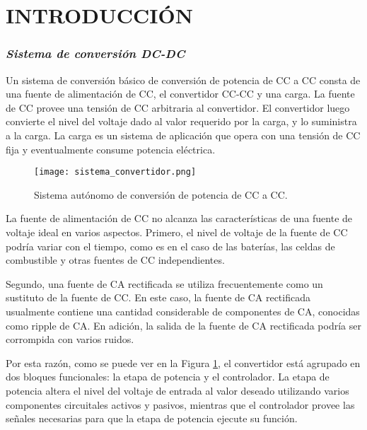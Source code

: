 \section*{\large{INTRODUCCIÓN}}
\vspace{-0.25cm}
\justifying

\subsubsection*{\it{Sistema de conversión DC-DC}}
\vspace{-0.25cm}
Un sistema de conversión básico de conversión de potencia de CC a CC consta de una fuente de alimentación de CC, el convertidor CC-CC y una carga.
La fuente de CC provee una tensión de CC arbitraria al convertidor. El convertidor luego convierte el nivel del voltaje dado al valor requerido
por la carga, y lo suministra a la carga. La carga es un sistema de aplicación que opera con una tensión de CC fija y eventualmente consume potencia
eléctrica.

\begin{figure}[H]
    \centering
    \texttt{[image: sistema\_convertidor.png]}
    \vspace{-0.25cm}
    \caption{Sistema autónomo de conversión de potencia de CC a CC.}
    \label{fig:sistema_convertidor}
\end{figure}
\vspace{-0.5cm}

La fuente de alimentación de CC no alcanza las características de una fuente de voltaje ideal en varios aspectos.
Primero, el nivel de voltaje de la fuente de CC podría variar con el tiempo, como es en el caso de las baterías, las celdas de combustible y otras
fuentes de CC independientes.

Segundo, una fuente de CA rectificada se utiliza frecuentemente como un sustituto de la fuente de CC. En este caso, la fuente de CA rectificada
usualmente contiene una cantidad considerable de componentes de CA, conocidas como ripple de CA. En adición, la salida de la fuente de CA rectificada
podría ser corrompida con varios ruidos.

Por esta razón, como se puede ver en la Figura \ref{fig:sistema_convertidor}, el convertidor está agrupado en dos bloques funcionales: la etapa de potencia
y el controlador. La etapa de potencia altera el nivel del voltaje de entrada al valor deseado utilizando varios componentes circuitales activos y pasivos,
mientras que el controlador provee las señales necesarias para que la etapa de potencia ejecute su función.

